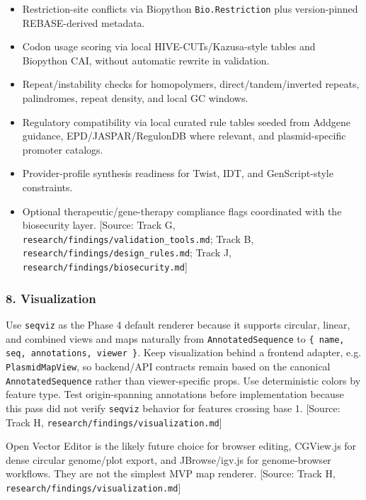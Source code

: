 \documentclass[11pt]{report}
\begin{document}
\begin{itemize}
\item Restriction-site conflicts via Biopython \texttt{Bio.Restriction} plus version-pinned REBASE-derived metadata.
\item Codon usage scoring via local HIVE-CUTs/Kazusa-style tables and Biopython CAI, without automatic rewrite in validation.
\item Repeat/instability checks for homopolymers, direct/tandem/inverted repeats, palindromes, repeat density, and local GC windows.
\item Regulatory compatibility via local curated rule tables seeded from Addgene guidance, EPD/JASPAR/RegulonDB where relevant, and plasmid-specific promoter catalogs.
\item Provider-profile synthesis readiness for Twist, IDT, and GenScript-style constraints.
\item Optional therapeutic/gene-therapy compliance flags coordinated with the biosecurity layer. [Source: Track G, \texttt{research/findings/validation\_tools.md}; Track B, \texttt{research/findings/design\_rules.md}; Track J, \texttt{research/findings/biosecurity.md}]
\end{itemize}

\subsubsection{8. Visualization}

Use \texttt{seqviz} as the Phase 4 default renderer because it supports circular, linear, and combined views and maps naturally from \texttt{AnnotatedSequence} to \texttt{\{ name, seq, annotations, viewer \}}. Keep visualization behind a frontend adapter, e.g. \texttt{PlasmidMapView}, so backend/API contracts remain based on the canonical \texttt{AnnotatedSequence} rather than viewer-specific props. Use deterministic colors by feature type. Test origin-spanning annotations before implementation because this pass did not verify \texttt{seqviz} behavior for features crossing base 1. [Source: Track H, \texttt{research/findings/visualization.md}]\par

Open Vector Editor is the likely future choice for browser editing, CGView.js for dense circular genome/plot export, and JBrowse/igv.js for genome-browser workflows. They are not the simplest MVP map renderer. [Source: Track H, \texttt{research/findings/visualization.md}]\par
\end{document}
